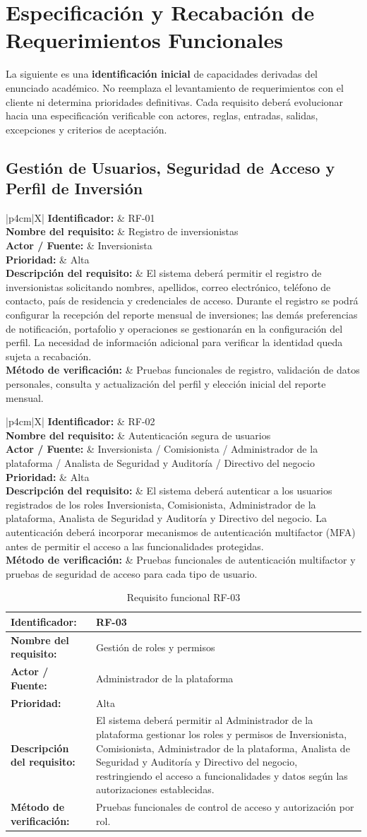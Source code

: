 \documentclass[11pt,a4paper,oneside]{article}
\newcommand{\tablaRequisito}[6]{%
\begin{table}[H]
\centering
\begin{tabularx}{\linewidth}{|p{4cm}|X|}
\hline
\textbf{Identificador:} & #1 \\ \hline
\textbf{Nombre del requisito:} & #2 \\ \hline
\textbf{Actor / Fuente:} & #3 \\ \hline
\textbf{Prioridad:} & #4 \\ \hline
\textbf{Descripción del requisito:} &
#5 \\ \hline
\textbf{Método de verificación:} & #6 \\ \hline
\end{tabularx}
\caption{Requisito funcional #1}
\label{tab:#1}
\end{table}
}
\begin{document}
\endgroup

\section{Especificación y Recabación de Requerimientos Funcionales}
La siguiente es una \textbf{identificación inicial} de capacidades derivadas del enunciado académico. No reemplaza el levantamiento de requerimientos con el cliente ni determina prioridades definitivas. Cada requisito deberá evolucionar hacia una especificación verificable con actores, reglas, entradas, salidas, excepciones y criterios de aceptación.

\subsection{Gestión de Usuarios, Seguridad de Acceso y Perfil de Inversión}

\tablaRequisito
{RF-01}
{Registro de inversionistas}
{Inversionista}
{Alta}
{El sistema deberá permitir el registro de inversionistas solicitando nombres, apellidos, correo electrónico, teléfono de contacto, país de residencia y credenciales de acceso. Durante el registro se podrá configurar la recepción del reporte mensual de inversiones; las demás preferencias de notificación, portafolio y operaciones se gestionarán en la configuración del perfil. La necesidad de información adicional para verificar la identidad queda sujeta a recabación.}
{Pruebas funcionales de registro, validación de datos personales, consulta y actualización del perfil y elección inicial del reporte mensual.}


\tablaRequisito
{RF-02}
{Autenticación segura de usuarios}
{Inversionista / Comisionista / Administrador de la plataforma / Analista de Seguridad y Auditoría / Directivo del negocio}
{Alta}
{El sistema deberá autenticar a los usuarios registrados de los roles Inversionista, Comisionista, Administrador de la plataforma, Analista de Seguridad y Auditoría y Directivo del negocio. La autenticación deberá incorporar mecanismos de autenticación multifactor (MFA) antes de permitir el acceso a las funcionalidades protegidas.}
{Pruebas funcionales de autenticación multifactor y pruebas de seguridad de acceso para cada tipo de usuario.}


\tablaRequisito
{RF-03}
{Gestión de roles y permisos}
{Administrador de la plataforma}
{Alta}
{El sistema deberá permitir al Administrador de la plataforma gestionar los roles y permisos de Inversionista, Comisionista, Administrador de la plataforma, Analista de Seguridad y Auditoría y Directivo del negocio, restringiendo el acceso a funcionalidades y datos según las autorizaciones establecidas.}
{Pruebas funcionales de control de acceso y autorización por rol.}
\end{document}
